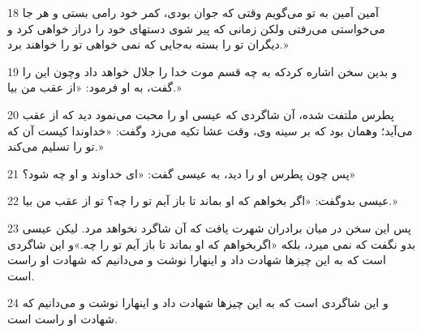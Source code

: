 \par 18 آمین آمین به تو می‌گویم وقتی که جوان بودی، کمر خود رامی بستی و هر جا می‌خواستی می‌رفتی ولکن زمانی که پیر شوی دستهای خود را دراز خواهی کرد و دیگران تو را بسته به‌جایی که نمی خواهی تو را خواهند برد.»
\par 19 و بدین سخن اشاره کردکه به چه قسم موت خدا را جلال خواهد داد وچون این را گفت، به او فرمود: «از عقب من بیا.»
\par 20 پطرس ملتفت شده، آن شاگردی که عیسی او را محبت می‌نمود دید که از عقب می‌آید؛ وهمان بود که بر سینه وی، وقت عشا تکیه می‌زد وگفت: «خداوندا کیست آن که تو را تسلیم می‌کند.»
\par 21 پس چون پطرس او را دید، به عیسی گفت: «ای خداوند و او چه شود؟»
\par 22 عیسی بدوگفت: «اگر بخواهم که او بماند تا باز آیم تو را چه؟ تو از عقب من بیا.»
\par 23 پس این سخن در میان برادران شهرت یافت که آن شاگرد نخواهد مرد. لیکن عیسی بدو نگفت که نمی میرد، بلکه «اگربخواهم که او بماند تا باز آیم تو را چه.»و این شاگردی است که به این چیزها شهادت داد و اینهارا نوشت و می‌دانیم که شهادت او راست است.
\par 24 و این شاگردی است که به این چیزها شهادت داد و اینهارا نوشت و می‌دانیم که شهادت او راست است.



